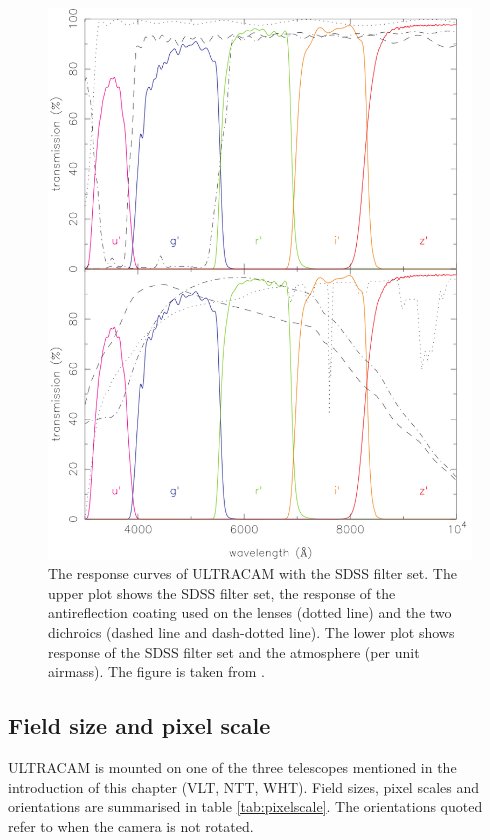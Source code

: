 \begin{figure}
\centering
\includegraphics[width=130mm]{images/ucamresponsecurves.png}
\caption{The response curves of ULTRACAM with the SDSS filter set. The upper plot shows the SDSS filter set, the response of the antireflection coating used on the lenses (dotted line) and the two dichroics (dashed line and dash-dotted line). The lower plot shows response of the SDSS filter set and the atmosphere (per unit airmass). The figure is taken from \citet{dhillon07}.}
\label{fig:responsecurves}
\end{figure}


\subsection{Field size and pixel scale}
ULTRACAM is mounted on one of the three telescopes mentioned in the introduction of this chapter (VLT, NTT, WHT). Field sizes, pixel scales and orientations are summarised in table \ref{tab:pixelscale}. The orientations quoted refer to when the camera is not rotated. 

